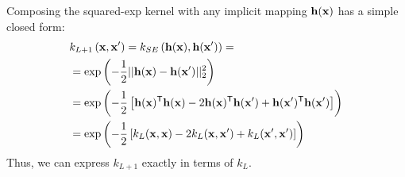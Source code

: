 \documentclass[twoside]{article}
\newcommand{\hphi}{h}
\newcommand{\hPhi}{\vh}
\begin{document}
Composing the squared-exp kernel with any implicit mapping $\hPhi(\vx)$ has a simple closed form:
%
\begin{align}
& k_{L+1} \left( \vx, \vx' \right) = k_{SE} \left( \hPhi(\vx), \hPhi(\vx') \right) =  \\
& = \exp \left( -\frac{1}{2} || \hPhi(\vx) - \hPhi(\vx')||_2^2 \right) \nonumber\\
& = \exp\left ( -\frac{1}{2} \left[ \hPhi(\vx) \tra \hPhi(\vx) - 2 \hPhi(\vx) \tra \hPhi(\vx') + \hPhi(\vx') \tra \hPhi(\vx') \right] \right) \nonumber \\
& = \exp \left( -\frac{1}{2} \left[ k_{L}(\vx, \vx) - 2 k_{L}(\vx, \vx') + k_{L}(\vx', \vx') \right] \right) \nonumber
\end{align}
%
%
%
Thus, we can express $k_{L+1}$ exactly in terms of $k_L$.
\end{document}
